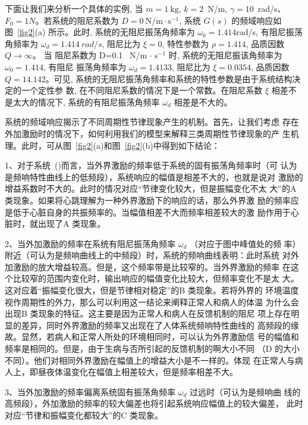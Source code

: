 \documentclass[withoutpreface,bwprint]{cumcmthesis} %
\begin{document}
下面让我们来分析一个具体的实例, 当  $m=1 \mathrm{~kg}$, $ k=2$~N/m, $\gamma=10$~rad/s、
$F_{0}=1 N  $。若系统的阻尼系数为 $ D=0 \mathrm{~N} / \mathrm{m} \cdot \mathrm{s}^{-1} $, 系统 $ G(s) $ 的频域响应如图~\ref{fig2}(a)
所示。此时, 系统的无阻尼振荡角频率为 $ \omega_{0}=1.414$rad/s, 有阻尼振荡角频率为  $\omega_{d}=1.414~rad/s$, 阻尼比为  $\xi=0 $, 特性参数为 $ \rho=1.414 $, 品质因数 $ Q \rightarrow \infty  $。 当
阻尼系数为  D=0.1 ~N/m $\cdot$ s$^{-1} $ 时, 系统的无阻尼振该角频率为 $ \omega_{0}=1.414 $, 有阻尼 振荡角频率为 $ \omega_{d}=1.4133 $, 阻尼比为 $ \xi=0.0354 $, 品质因数  $Q=14.142  $。可见, 系统的无阻尼振荡角频率和系统的特性参数是由于系统结构决定的一个定性参 数, 在不同阻尼系数的情况下是一个常数。在阻尼系数 $ \xi $ 相差不是太大的情况下, 系统的有阻尼振荡角频率 $ \omega_{d} $ 相差是不大的。

系统的频域响应揭示了不同周期性节律现象产生的机制。首先，让我们考虑
存在外加激励时的情况下，如何利用我们的模型来解释三类周期性节律现象的产
生机理。此时，可从图~\ref{fig2}(a)和图~\ref{fig2}(b)中得到如下结论：

1、对于系统~()而言，当外界激励的频率低于系统的固有振荡角频率时（可
认为是频响特性曲线上的低频段），系统响应的幅值是相差不大的，也就是说对
激励的增益系数时不大的。此时的情况对应“节律变化较大，但是振幅变化不太
大”的A 类现象。如果将心跳理解为一种外界激励下的响应的话，那么外界激
励的频率应是低于心脏自身的共振频率的。当幅值相差不大而频率相差较大的激
励作用于心脏时，就出现了A 类现象。

2、当外加激励的频率在系统有阻尼振荡角频率 $\omega_d$ （对应于图中峰值处的频
率）附近（可认为是频响曲线上的中频段）时，系统的频响曲线表明：此时系统
对外加激励的放大增益较高。但是，这个频率带是比较窄的。当外界激励的频率
在这个比较窄的范围内变化时，输出响应的幅值变化比较大，但频率变化不是太
大。这对应着“振幅变化很大，但是节律相对稳定”的B 类现象。若将外界的
环境温度视作周期性的外力，那么可以利用这一结论来阐释正常人和病人的体温
为什么会出现B 类现象的特征。这主要是因为正常人和病人在反馈机制的阻尼
项上存在明显的差异，同时外界激励的频率又出现在了人体系统频响特性曲线的
高频段的缘故。显然，若病人和正常人所处的环境相同时，可以认为外界激励信
号的幅值和频率是相同的。但是，由于生病与否所引起的反馈机制的啊大小不同
（D 的大小不同）。他们对相同外界激励在幅值上的增益大小是不一样的。体现
在正常人与病人上，即昼夜体温变化在幅值上相差较大，但是频率相差不大。

3、当外加激励的频率偏离系统固有振荡角频率 $\omega_d$ 过远时（可认为是频响曲
线的高频段），外加激励的频率的较大偏差也将引起系统响应幅值上的较大偏差，
此时对应“节律和振幅变化都较大”的C 类现象。
\end{document}
